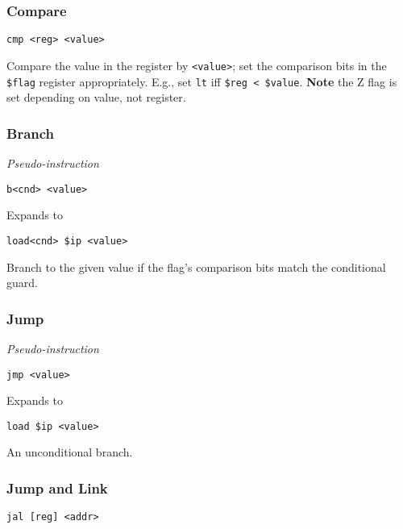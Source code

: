 \subsubsection{Compare}

\begin{lstlisting}[style=assembly]
    cmp <reg> <value>
\end{lstlisting}

Compare the value in the register by \texttt{<value>}; set the comparison bits in the \texttt{\$flag} register appropriately.
E.g., set \texttt{lt} iff \texttt{\$reg < \$value}.
\textbf{Note} the Z flag is set depending on value, not register.

\subsubsection{Branch}

\textit{Pseudo-instruction}

\begin{lstlisting}[style=assembly]
    b<cnd> <value>
\end{lstlisting}

Expands to

\begin{lstlisting}[style=assembly]
    load<cnd> $ip <value>
\end{lstlisting}

Branch to the given value if the flag's comparison bits match the conditional guard.

\subsubsection{Jump}

\textit{Pseudo-instruction}

\begin{lstlisting}[style=assembly]
    jmp <value>
\end{lstlisting}

Expands to

\begin{lstlisting}[style=assembly]
    load $ip <value>
\end{lstlisting}

An unconditional branch.

\subsubsection{Jump and Link}

\begin{lstlisting}[style=assembly]
    jal [reg] <addr>
\end{lstlisting}


